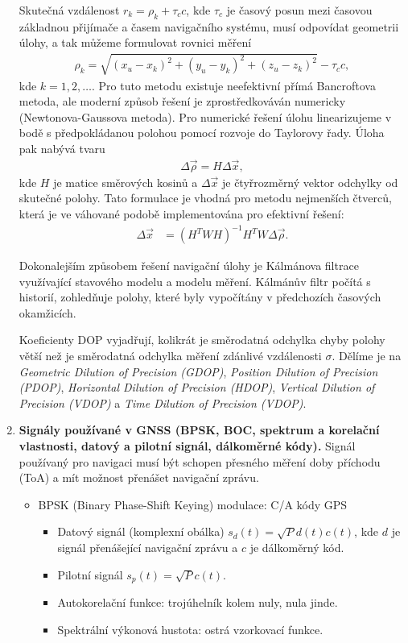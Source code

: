 \documentclass[11pt,a4paper]{article}
\begin{document}
\begin{enumerate}
    Skutečná vzdálenost $r_k = \rho_k + \tau_c c$, kde $\tau_c$ je časový posun mezi časovou základnou přijímače a časem navigačního systému, musí odpovídat geometrii úlohy, a tak můžeme formulovat rovnici měření
    \begin{align}
        \rho_k = \sqrt{(x_u-x_k)^2+(y_u-y_k)^2+(z_u-z_k)^2} - \tau_c c,
    \end{align}
    kde $k = 1,2,\dots$. Pro tuto metodu existuje neefektivní přímá Bancroftova metoda, ale moderní způsob řešení je zprostředkováván numericky (Newtonova-Gaussova metoda). Pro numerické řešení úlohu linearizujeme v bodě s předpokládanou polohou pomocí rozvoje do Taylorovy řady. Úloha pak nabývá tvaru
    \begin{align}
        \Delta \vec \rho = H \Delta \vec x,
    \end{align}
    kde $H$ je matice směrových kosinů a $\Delta \vec x$ je čtyřrozměrný vektor odchylky od skutečné polohy. Tato formulace je vhodná pro metodu nejmenších čtverců, která je ve váhované podobě implementována pro efektivní řešení:
    \begin{align}
        \Delta \vec x &= (H^TWH)^{-1}H^TW\Delta \vec \rho.
    \end{align}

    Dokonalejším způsobem řešení navigační úlohy je Kálmánova filtrace využívající stavového modelu a modelu měření. Kálmánův filtr počítá s historií, zohledňuje polohy, které byly vypočítány v předchozích časových okamžicích.

    Koeficienty DOP vyjadřují, kolikrát je směrodatná odchylka chyby polohy větší než je směrodatná odchylka měření zdánlivé vzdálenosti $\sigma$. Dělíme je na \emph{Geometric Dilution of Precision (GDOP)}, \emph{Position Dilution of Precision (PDOP)}, \emph{Horizontal Dilution of Precision (HDOP)}, \emph{Vertical Dilution of Precision (VDOP)} a \emph{Time Dilution of Precision (VDOP)}.
    
    \item \textbf{Signály používané v GNSS (BPSK, BOC, spektrum a korelační vlastnosti, datový a pilotní signál, dálkoměrné kódy).}
    Signál používaný pro navigaci musí být schopen přesného měření doby příchodu (ToA) a mít možnost přenášet navigační zprávu.
    \begin{itemize}
        \item BPSK (Binary Phase-Shift Keying) modulace: C/A kódy GPS
        \begin{itemize}
            \item Datový signál (komplexní obálka) $s_d(t) = \sqrt Pd(t)c(t)$, kde $d$ je signál přenášející navigační zprávu a $c$ je dálkoměrný kód.
            \item Pilotní signál $s_p(t) = \sqrt Pc(t)$.
            \item Autokorelační funkce: trojúhelník kolem nuly, nula jinde.
            \item Spektrální výkonová hustota: ostrá vzorkovací funkce.
        \end{itemize}


\end{itemize}
\end{enumerate}
\end{document}

